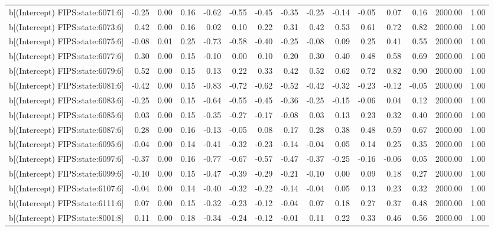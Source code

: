 \begin{table}[ht]
\begin{tabular}{rrrrrrrrrrrrrrr}
  b[(Intercept) FIPS:state:6071:6] & -0.25 & 0.00 & 0.16 & -0.62 & -0.55 & -0.45 & -0.35 & -0.25 & -0.14 & -0.05 & 0.07 & 0.16 & 2000.00 & 1.00 \\ 
  b[(Intercept) FIPS:state:6073:6] & 0.42 & 0.00 & 0.16 & 0.02 & 0.10 & 0.22 & 0.31 & 0.42 & 0.53 & 0.61 & 0.72 & 0.82 & 2000.00 & 1.00 \\ 
  b[(Intercept) FIPS:state:6075:6] & -0.08 & 0.01 & 0.25 & -0.73 & -0.58 & -0.40 & -0.25 & -0.08 & 0.09 & 0.25 & 0.41 & 0.55 & 2000.00 & 1.00 \\ 
  b[(Intercept) FIPS:state:6077:6] & 0.30 & 0.00 & 0.15 & -0.10 & 0.00 & 0.10 & 0.20 & 0.30 & 0.40 & 0.48 & 0.58 & 0.69 & 2000.00 & 1.00 \\ 
  b[(Intercept) FIPS:state:6079:6] & 0.52 & 0.00 & 0.15 & 0.13 & 0.22 & 0.33 & 0.42 & 0.52 & 0.62 & 0.72 & 0.82 & 0.90 & 2000.00 & 1.00 \\ 
  b[(Intercept) FIPS:state:6081:6] & -0.42 & 0.00 & 0.15 & -0.83 & -0.72 & -0.62 & -0.52 & -0.42 & -0.32 & -0.23 & -0.12 & -0.05 & 2000.00 & 1.00 \\ 
  b[(Intercept) FIPS:state:6083:6] & -0.25 & 0.00 & 0.15 & -0.64 & -0.55 & -0.45 & -0.36 & -0.25 & -0.15 & -0.06 & 0.04 & 0.12 & 2000.00 & 1.00 \\ 
  b[(Intercept) FIPS:state:6085:6] & 0.03 & 0.00 & 0.15 & -0.35 & -0.27 & -0.17 & -0.08 & 0.03 & 0.13 & 0.23 & 0.32 & 0.40 & 2000.00 & 1.00 \\ 
  b[(Intercept) FIPS:state:6087:6] & 0.28 & 0.00 & 0.16 & -0.13 & -0.05 & 0.08 & 0.17 & 0.28 & 0.38 & 0.48 & 0.59 & 0.67 & 2000.00 & 1.00 \\ 
  b[(Intercept) FIPS:state:6095:6] & -0.04 & 0.00 & 0.14 & -0.41 & -0.32 & -0.23 & -0.14 & -0.04 & 0.05 & 0.14 & 0.25 & 0.35 & 2000.00 & 1.00 \\ 
  b[(Intercept) FIPS:state:6097:6] & -0.37 & 0.00 & 0.16 & -0.77 & -0.67 & -0.57 & -0.47 & -0.37 & -0.25 & -0.16 & -0.06 & 0.05 & 2000.00 & 1.00 \\ 
  b[(Intercept) FIPS:state:6099:6] & -0.10 & 0.00 & 0.15 & -0.47 & -0.39 & -0.29 & -0.21 & -0.10 & 0.00 & 0.09 & 0.18 & 0.27 & 2000.00 & 1.00 \\ 
  b[(Intercept) FIPS:state:6107:6] & -0.04 & 0.00 & 0.14 & -0.40 & -0.32 & -0.22 & -0.14 & -0.04 & 0.05 & 0.13 & 0.23 & 0.32 & 2000.00 & 1.00 \\ 
  b[(Intercept) FIPS:state:6111:6] & 0.07 & 0.00 & 0.15 & -0.32 & -0.23 & -0.12 & -0.04 & 0.07 & 0.18 & 0.27 & 0.37 & 0.48 & 2000.00 & 1.00 \\ 
  b[(Intercept) FIPS:state:8001:8] & 0.11 & 0.00 & 0.18 & -0.34 & -0.24 & -0.12 & -0.01 & 0.11 & 0.22 & 0.33 & 0.46 & 0.56 & 2000.00 & 1.00 \\ 

\end{tabular}
\end{table}
